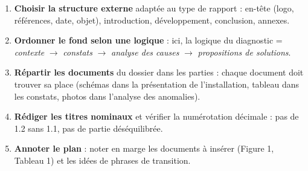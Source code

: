 \documentclass[11pt]{article}
\begin{document}
\begin{methode}
\begin{enumerate}
\item \textbf{Choisir la structure externe} adaptée au type de rapport : en-tête (logo, références, date, objet), introduction, développement, conclusion, annexes.
\item \textbf{Ordonner le fond selon une logique} : ici, la logique du diagnostic = \emph{contexte} $\rightarrow$ \emph{constats} $\rightarrow$ \emph{analyse des causes} $\rightarrow$ \emph{propositions de solutions}.
\item \textbf{Répartir les documents} du dossier dans les parties : chaque document doit trouver sa place (schémas dans la présentation de l'installation, tableau dans les constats, photos dans l'analyse des anomalies).
\item \textbf{Rédiger les titres nominaux} et vérifier la numérotation décimale : pas de 1.2 sans 1.1, pas de partie déséquilibrée.
\item \textbf{Annoter le plan} : noter en marge les documents à insérer (Figure 1, Tableau 1) et les idées de phrases de transition.
\end{enumerate}
\end{methode}
\end{document}
